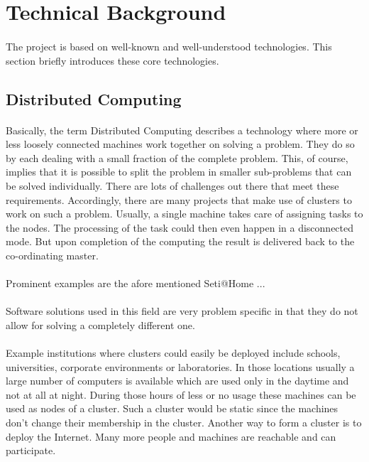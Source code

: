 \section{Technical Background}%
\paragraph{}
The project is based on well-known and well-understood technologies. This section briefly introduces these core technologies.

\subsection{Distributed Computing}
\paragraph{}
Basically, the term Distributed Computing describes a technology where more or less loosely connected machines work together on solving a problem. They do so by each dealing with a small fraction of the complete problem. This, of course, implies that it is possible to split the problem in smaller sub-problems that can be solved individually. There are lots of challenges out there that meet these requirements. Accordingly, there are many projects that make use of clusters to work on such a problem. Usually, a single machine takes care of assigning tasks to the nodes. The processing of the task could then even happen in a disconnected mode. But upon completion of the computing the result is delivered back to the co-ordinating master.
\paragraph{}
Prominent examples are the afore mentioned Seti@Home ...

\paragraph{}
Software solutions used in this field are very problem specific in that they do not allow for solving a completely different one. 

\paragraph{}
Example institutions where clusters could easily be deployed include schools, universities, corporate environments or laboratories. In those locations usually a large number of computers is available which are used only in the daytime and not at all at night. During those hours of less or no usage these machines can be used as nodes of a cluster. Such a cluster would be static since the machines don't change their membership in the cluster. Another way to form a cluster is to deploy the Internet. Many more people and machines are reachable and can participate.

